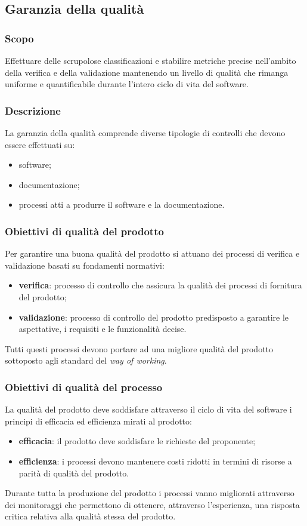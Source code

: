 \subsection{Garanzia della qualità}
					
	\subsubsection{Scopo}
	Effettuare delle scrupolose classificazioni e stabilire metriche precise nell'ambito della verifica e della validazione mantenendo un livello di qualità che rimanga uniforme e quantificabile durante l'intero ciclo di vita del software.
					
	\subsubsection{Descrizione}
	La garanzia della qualità comprende diverse tipologie di controlli che devono essere effettuati su:
	\begin{itemize}
		\item software;
		\item documentazione;
		\item processi atti a produrre il software e la documentazione.						
	\end{itemize}	
				
	\subsubsection{Obiettivi di qualità del prodotto}	
	Per garantire una buona qualità del prodotto si attuano dei processi di verifica e validazione basati su fondamenti normativi:
	\begin{itemize}
		\item \textbf{verifica}: processo di controllo che assicura la qualità dei processi di fornitura del prodotto;
		\item \textbf{validazione}: processo di controllo del prodotto predisposto a garantire le aspettative, i requisiti e le funzionalità decise.
	\end{itemize}
	Tutti questi processi devono portare ad una migliore qualità del prodotto sottoposto agli standard del \textit{way of working}.
					
	\subsubsection{Obiettivi di qualità del processo}
	La qualità del prodotto deve soddisfare attraverso il ciclo di vita del software i principi di efficacia ed efficienza mirati al prodotto:
	\begin{itemize}
		\item \textbf{efficacia}: il prodotto deve soddisfare le richieste del proponente;
		\item \textbf{efficienza}: i processi devono mantenere costi ridotti in termini di risorse a parità di qualità del prodotto.
	\end{itemize}
	Durante tutta la produzione del prodotto i processi vanno migliorati attraverso dei monitoraggi che permettono di ottenere, attraverso l'esperienza, una risposta critica relativa alla qualità stessa del prodotto.
					

